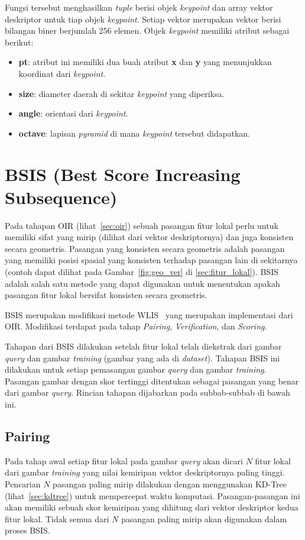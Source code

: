 Fungsi tersebut menghasilkan \textit{tuple} berisi objek \textit{keypoint} dan array vektor deskriptor untuk tiap objek \textit{keypoint}. Setiap vektor merupakan vektor berisi bilangan biner berjumlah 256 elemen. Objek \textit{keypoint} memiliki atribut sebagai berikut:
\begin{itemize}
	\item \textbf{pt}: atribut ini memiliki dua buah atribut \textbf{x} dan \textbf{y} yang menunjukkan koordinat dari \textit{keypoint}.
	\item \textbf{size}: diameter daerah di sekitar \textit{keypoint} yang diperiksa.
	\item \textbf{angle}: orientasi dari \textit{keypoint}.
	\item \textbf{octave}: lapisan \textit{pyramid} di mana \textit{keypoint} tersebut didapatkan.
\end{itemize}

\section{BSIS (Best Score Increasing Subsequence)}
\label{sec:bsis}
Pada tahapan OIR (lihat~\ref{sec:oir}) sebuah pasangan fitur lokal perlu untuk memiliki sifat yang mirip (dilihat dari vektor deskriptornya) dan juga konsisten secara geometris. Pasangan yang konsisten secara geometris adalah pasangan yang memiliki posisi spasial yang konsisten terhadap pasangan lain di sekitarnya (contoh dapat dilihat pada Gambar~\ref{fig:geo_ver} di \ref{sec:fitur_lokal}). BSIS~\cite{kusuma2019geometric} adalah salah satu metode yang dapat digunakan untuk menentukan apakah pasangan fitur lokal bersifat konsisten secara geometris. 

BSIS merupakan modifikasi metode WLIS~\cite{kusuma2012appearance} yang merupakan implementasi dari OIR. Modifikasi terdapat pada tahap \textit{Pairing}, \textit{Verification}, dan \textit{Scoring}. 

Tahapan dari BSIS dilakukan setelah fitur lokal telah diekstrak dari gambar \textit{query} dan gambar \textit{training} (gambar yang ada di \textit{dataset}). Tahapan BSIS ini dilakukan untuk setiap pemasangan gambar \textit{query} dan gambar \textit{training}. Pasangan gambar dengan skor tertinggi ditentukan sebagai pasangan yang benar dari gambar \textit{query}. Rincian tahapan dijabarkan pada subbab-subbab di bawah ini. 

\subsection{Pairing}
\label{subsec:bsis_pairing}
Pada tahap awal setiap fitur lokal pada gambar \textit{query} akan dicari $N$ fitur lokal dari gambar \textit{training} yang nilai kemiripan vektor deskriptornya paling tinggi. Pencarian $N$ pasangan paling mirip dilakukan dengan menggunakan KD-Tree (lihat~\ref{sec:kdtree}) untuk mempercepat waktu komputasi. Pasangan-pasangan ini akan memiliki sebuah skor kemiripan yang dihitung dari vektor deskriptor kedua fitur lokal. Tidak semua dari $N$ pasangan paling mirip akan digunakan dalam proses BSIS. 

